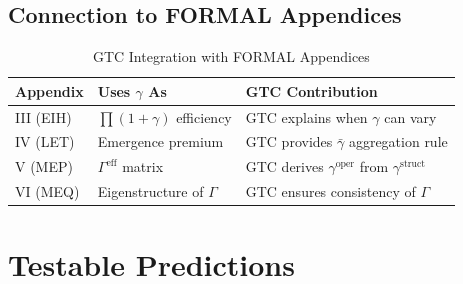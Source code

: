 \subsection{Connection to FORMAL Appendices}

\begin{table}[H]
\centering
\caption{GTC Integration with FORMAL Appendices}
\label{tab:gtc-formal-integration}
\renewcommand{\arraystretch}{1.4}
\begin{tabular}{@{}llp{6cm}@{}}
\toprule
\textbf{Appendix} & \textbf{Uses $\gamma$ As} & \textbf{GTC Contribution} \\
\midrule
III (EIH) & $\prod(1 + \gamma)$ efficiency & GTC explains when $\gamma$ can vary \\
IV (LET) & Emergence premium & GTC provides $\bar{\gamma}$ aggregation rule \\
V (MEP) & $\Gamma^{\text{eff}}$ matrix & GTC derives $\gamma^{\text{oper}}$ from $\gamma^{\text{struct}}$ \\
VI (MEQ) & Eigenstructure of $\Gamma$ & GTC ensures consistency of $\Gamma$ \\
\bottomrule
\end{tabular}
\end{table}

\section{Testable Predictions}
\label{sec:gtc-predictions}

